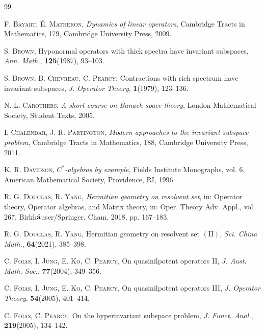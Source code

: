 \documentclass[12pt]{amsart}
\numberwithin{equation}{section}
\theoremstyle{plain}
\theoremstyle{definition}
\begin{document}
\begin{thebibliography}{99}

\textsc{F. Bayart, \'{E}. Matheron}, \textit{Dynamics of linear operators}, Cambridge Tracts in Mathematics, 179, Cambridge University Press, 2009.


\textsc{S. Brown}, Hyponormal operators with thick spectra have invariant subspaces, \textit{Ann. Math.}, \textbf{125}(1987), 93--103.



\textsc{S. Brown, B. Chevreau, C. Pearcy}, Contractions with rich spectrum have invariant subspaces, \textit{J. Operator Theory}, \textbf{1}(1979), 123--136.



\textsc{N. L. Carothers}, \textit{A short course on Banach space theory}, London Mathematical Society, Student Texts, 2005.


\textsc{I. Chalendar, J. R. Partington}, \textit{Modern approaches to the invariant subspace problem}, Cambridge Tracts in Mathematics, 188, Cambridge University Press, 2011.


\textsc{K. R. Davidson}, \textit{$C^*$-algebras by example}, Fields Institute Monographs, vol. 6, American Mathematical Society, Providence, RI, 1996.


\textsc{R. G. Douglas, R. Yang}, \textit{Hermitian geometry on resolvent set}, in: Operator theory, Operator algebras, and Matrix theory, in: Oper. Theory Adv. Appl., vol. 267, Birkh$\ddot{\rm a}$user/Springer, Cham, 2018, pp. 167--183.


\textsc{R. G. Douglas, R. Yang}, Hermitian geometry on resolvent set $(\mathrm{II})$, \textit{Sci. China Math.}, \textbf{64}(2021), 385--398.


\textsc{C. Foias, I. Jung, E. Ko, C. Pearcy}, On quasinilpotent operators \rm{II},
\textit{J. Aust. Math. Soc.}, \textbf{77}(2004), 349--356.


\textsc{C. Foias, I. Jung, E. Ko, C. Pearcy},
On quasinilpotent operators \rm{III}, \textit{J. Operator Theory},
\textbf{54}(2005), 401--414.


\textsc{C. Foias, C. Pearcy}, On the hyperinvariant subspace problem,
\textit{J. Funct. Anal.}, \textbf{219}(2005), 134--142.



\end{thebibliography}
\end{document}
